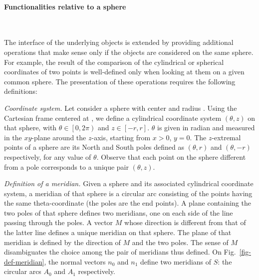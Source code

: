 \paragraph{Functionalities relative to a sphere}~

The interface of the underlying objects is extended by providing
additional operations that make sense only if the objects are
considered on the same sphere. For example, the result of the comparison of the
cylindrical or spherical coordinates of two points is well-defined
only when looking at them on a given common sphere. The presentation
of these operations requires the following definitions:

\textit{Coordinate system.}
Let consider a sphere with center  and radius . Using
the Cartesian frame centered at , we define a cylindrical
coordinate system $(\theta,z)$ on that sphere, with $\theta \in \left[
  0,2\pi \right)$ and $z \in \left[ -r,r \right]$. $\theta$ is given
in radian and measured in the $xy$-plane around the $z$-axis, starting
from $x>0$, $y=0$. The $z$-extremal points of a sphere are its North
and South poles defined as $(\theta,r)$ and $(\theta,-r)$
respectively, for any value of $\theta$. Observe that each point on
the sphere different from a pole corresponds to a unique pair
$(\theta,z)$.

\textit{Definition of a meridian.}
Given a sphere and its associated cylindrical coordinate system, a meridian of that
sphere is a circular arc consisting of the points having the same theta-coordinate
(the poles are the end points).
A plane containing the two poles of that sphere defines two meridians, one on each side
of the line passing through the poles. A vector $M$ whose direction is different from that of the latter
line defines a unique meridian on that sphere. The plane of that meridian is defined by the
direction of $M$ and the two poles. The sense of $M$ disambiguates the choice among the
pair of meridians thus defined.
On Fig.~\ref{fig-def-meridian}, the normal vectors $n_0$ and $n_1$ define 
two meridians of $S$: the circular arcs $A_0$ and $A_1$ respectively.



